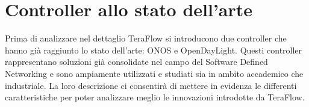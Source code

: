 

\section{Controller allo stato dell'arte}
Prima di analizzare nel dettaglio TeraFlow si introducono due controller che hanno già raggiunto lo stato dell'arte: ONOS e OpenDayLight.
Questi controller rappresentano soluzioni già consolidate nel campo del Software Defined Networking e sono ampiamente utilizzati e studiati sia in ambito accademico che industriale.
La loro descrizione ci consentirà di mettere in evidenza le differenti caratteristiche per poter analizzare meglio le innovazioni introdotte da TeraFlow.

